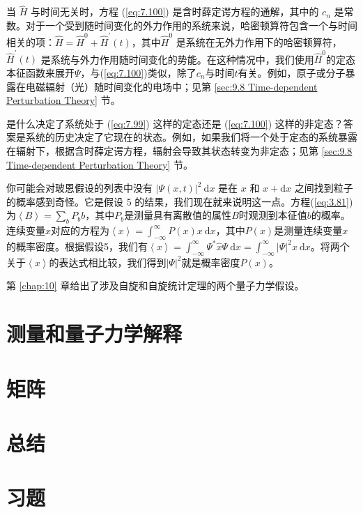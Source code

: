     当 $\hat{H}$ 与时间无关时，方程 (\ref{eq:7.100}) 是含时薛定谔方程的通解，其中的 $c_n$ 是常数。对于一个受到随时间变化的外力作用的系统来说，哈密顿算符包含一个与时间相关的项：$\hat{H} = \hat{H}^0 + \hat{H}^{\prime}\left(t\right)$，其中$\hat{H}^0$ 是系统在无外力作用下的哈密顿算符，$\hat{H}^{\prime}\left(t\right)$ 是系统与外力作用随时间变化的势能。在这种情况中，我们使用$\hat{H}^0$的定态本征函数来展开$\Psi$，与(\ref{eq:7.100})类似，除了$c_n$与时间$t$有关。例如，原子或分子暴露在电磁辐射（光）随时间变化的电场中；见第 \ref{sec:9.8 Time-dependent Perturbation Theory} 节。

    是什么决定了系统处于 (\ref{eq:7.99}) 这样的定态还是 (\ref{eq:7.100}) 这样的非定态？答案是系统的历史决定了它现在的状态。例如，如果我们将一个处于定态的系统暴露在辐射下，根据含时薛定谔方程，辐射会导致其状态转变为非定态；见第 \ref{sec:9.8 Time-dependent Perturbation Theory} 节。

    你可能会对玻恩假设的列表中没有 $\left|\Psi\left(x,t\right)\right|^2\:\mathrm{d}x$ 是在 $x$ 和 $x+\mathrm{d}x$ 之间找到粒子的概率感到奇怪。它是假设 5 的结果，我们现在就来说明这一点。方程(\ref{eq:3.81})为$\left\langle B \right\rangle = \sum_{b}P_bb$，其中$P_b$是测量具有离散值的属性$B$时观测到本征值$b$的概率。连续变量$x$对应的方程为$\left\langle x \right\rangle = \int_{-\infty}^{\infty}P\left(x\right)x\:\mathrm{d}x$，其中$P\left(x\right)$是测量连续变量$x$的概率密度。根据假设5，我们有$\left\langle x \right\rangle= \int_{-\infty}^{\infty}\Psi^{\ast}\hat{x}\Psi\:\mathrm{d}x = \int_{-\infty}^{\infty}\left|\Psi\right|^2x\:\mathrm{d}x$。将两个关于$\left\langle x \right\rangle$的表达式相比较，我们得到$\left|\Psi\right|^2$就是概率密度$P\left(x\right)$。

    第 \ref{chap:10} 章给出了涉及自旋和自旋统计定理的两个量子力学假设。

\section{测量和量子力学解释}
\label{sec:7.9 Measurement and the Interpretation of Quantum Mechanics}




















\section{矩阵}
\label{sec:7.10 Matrices}

\section*{总结}

\section*{习题}